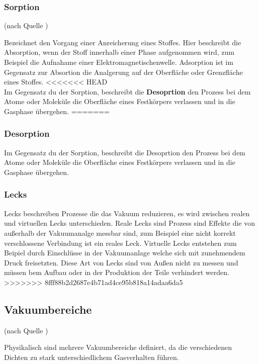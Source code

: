 		\subsubsection{Sorption}(nach Quelle \cite{wiki:sor})
			
			\noindent
			Bezeichnet den Vorgang einer Anreicherung eines Stoffes. 
			Hier beschreibt die Absorption, wenn der Stoff innerhalb einer Phase aufgenommen wird, zum Beispiel die Aufnahame einer Elektromagnetischenwelle.
			Adsorption ist im Gegensatz zur Absortion die Analgerung auf der Oberfläche oder Grenzfläche eines Stoffes.
<<<<<<< HEAD
			\\
			Im Gegensatz du der Sorption, beschreibt die \textbf{Desoprtion} den Prozess bei dem Atome oder Moleküle die Oberfläche eines Festkörpers verlassen und in die Gasphase übergehen.
=======

		\subsubsection{Desorption}

			Im Gegensatz du der Sorption, beschreibt die Desoprtion den Prozess bei dem Atome oder Moleküle die Oberfläche eines Festkörpers verlassen und in die Gasphase übergehen.
		
		\subsubsection{Lecks}

			Lecks beschreiben Prozesse die das Vakuum reduzieren, es wird zwischen realen und virtuellen Lecks unterschieden.
			Reale Lecks sind Prozess sind Effekte die von außerhalb der Vakuumanalge messbar sind, zum Beispiel eine nicht korrekt verschlossene Verbindung ist ein reales Leck.
			Virtuelle Lecks entstehen zum Beipiel durch Einschlüsse in der Vakuumanlage welche sich mit zunehmendem Druck freisetzten.
			Diese Art von Lecks sind von Außen nicht zu messen und müssen bem Aufbau oder in der Produktion der Teile verhindert werden.  		
>>>>>>> 8fff88b2d2687e4b71ad4ce95b818a14adaa6da5

	\subsection{Vakuumbereiche}(nach Quelle \cite{pfeiffer:grund})

			\noindent
		Physikalisch sind mehrere Vakuumbereiche definiert, da die verschiedenen Dichten zu stark unterschiedlichem Gasverhalten führen. 

